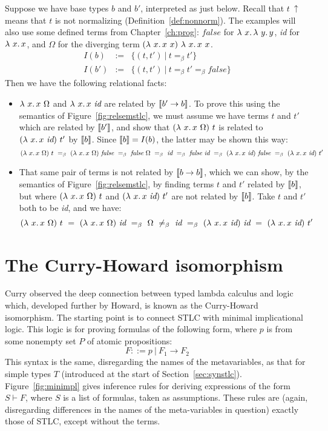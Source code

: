 Suppose we have base types $b$ and $b'$, interpreted as just below.
Recall that $t\ \uparrow$ means that $t$ is not normalizing
(Definition~\ref{def:nonnorm}).  The examples will also use some
defined terms from Chapter~\ref{ch:prog}: $\textit{false}$ for
$\lambda\ x.\, \lambda\ y.\, y$, \textit{id} for $\lambda\ x.\, x$, and $\Omega$ for
the diverging term $(\lam{x}{x\ x})\ \lam{x}{x\ x}$.
\[
\begin{array}{lll}
  I(b) & := & \{ (t,t')\ |\ t =_\beta t' \} \\
  I(b') & := & \{ (t,t')\ |\ t =_\beta t' =_\beta \textit{false} \}
\end{array}
\]
\noindent Then we have the following relational facts:
\begin{itemize}
\item $\lambda\ x.\, x\ \Omega$ and $\lambda\ x.\, x\ \textit{id}$ are related
  by $\llbracket b' \to b \rrbracket$.  To prove this using the semantics of
  Figure~\ref{fig:relsemstlc}, we must assume we have terms $t$ and
  $t'$ which are related by $\llbracket b' \rrbracket$, and show that
  $(\lambda\ x.\, x\ \Omega)\ t$ is related to $(\lam{x}{x\ \textit{id}})\ t'$ by
  $\llbracket b \rrbracket$.  Since $\llbracket b \rrbracket = I(b)$, the latter may be shown this
  way:
  \[
  (\lam{x}{x\ \Omega})\ t \ =_\beta \  (\lam{x}{x\ \Omega})\ \textit{false} \ =_\beta \ \textit{false}\ \Omega\ =_\beta\ \textit{id} \ =_\beta\ \textit{false}\ \textit{id}\ =_\beta \ (\lam{x}{x\ \textit{id}})\ \textit{false} \ =_\beta \ (\lam{x}{x\ \textit{id}})\ t'
      \]

 \item That same pair of terms is not related by $\llbracket b \to b \rrbracket$,
      which we can show, by the semantics of Figure~\ref{fig:relsemstlc},
      by finding terms $t$ and $t'$ related by $\llbracket b \rrbracket$, but
      where $(\lambda\ x.\, x\ \Omega)\ t$ and $(\lam{x}{x\ \textit{id}})\ t'$
      are not related by $\llbracket b \rrbracket$.  Take $t$ and $t'$ both to be \textit{id},
      and we have:
     \[
     (\lam{x}{x\ \Omega})\ t\ =\ (\lam{x}{x\ \Omega})\ \textit{id}\ =_\beta\ \Omega \ \neq_\beta\ \textit{id}\ =_\beta\ (\lam{x}{x\ \textit{id}})\ \textit{id}\ = \ (\lam{x}{x\ \textit{id}})\ t'
     \]
     \end{itemize}

\section{The Curry-Howard isomorphism}

Curry observed the deep connection between typed lambda calculus and
logic which, developed further by Howard, is known as the Curry-Howard
isomorphism.  The starting point is to connect STLC with minimal
implicational logic.  This logic is for proving formulas of the
following form, where $p$ is from some nonempty set $P$ of atomic
propositions:
\[
F ::= p\ |\ F_1 \to F_2
\]
\noindent This syntax is the same, disregarding the names of the
metavariables, as that for simple types $T$ (introduced at the start
of Section~\ref{sec:synstlc}).  Figure~\ref{fig:minimpl} gives
inference rules for deriving expressions of the form $S \vdash F$,
where $S$ is a list of formulas, taken as assumptions.  These rules
are (again, disregarding differences in the names of the
meta-variables in question) exactly those of STLC, except without
the terms.

